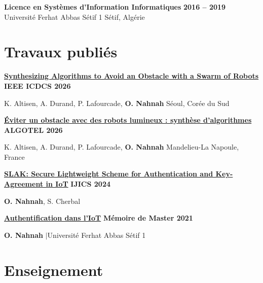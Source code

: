 \documentclass[a4paper,10pt]{article}
\begin{document}
\vspace{3pt}

\textbf{Licence en Systèmes d’Information Informatiques} \hfill \textbf{2016 -- 2019}\\
\textcolor{textgray}{Université Ferhat Abbas Sétif 1 \hfill Sétif, Algérie}

\section{Travaux publiés}

\noindent\href{https://sancy.iut.uca.fr/~durand/docs/ICDCS26.pdf}{\textbf{Synthesizing Algorithms to Avoid an Obstacle with a Swarm of Robots}} \hfill \textbf{IEEE ICDCS 2026}\par
\noindent\textcolor{textgray}{K. Altisen, A. Durand, P. Lafourcade, \textbf{O. Nahnah} \hfill Séoul, Corée du Sud}\par

\vspace{3pt}

\noindent\href{https://uca.hal.science/hal-05600384v1/file/algotel.pdf}{\textbf{Éviter un obstacle avec des robots lumineux : synthèse d’algorithmes}} \hfill \textbf{ALGOTEL 2026}\par
\noindent\textcolor{textgray}{K. Altisen, A. Durand, P. Lafourcade, \textbf{O. Nahnah} \hfill Mandelieu-La Napoule, France}\par

\vspace{3pt}

\noindent\href{https://doi.org/10.1504/IJICS.2024.137741}{\textbf{SLAK: Secure Lightweight Scheme for Authentication and Key-Agreement in IoT}} \hfill \textbf{IJICS 2024}\par
\noindent\textcolor{textgray}{\textbf{O. Nahnah}, S. Cherbal}\par

\vspace{3pt}

\noindent\href{https://overleaf.com/read/cmbwcyphtjbn#285e0a}{\textbf{Authentification dans l’IoT}} \hfill \textbf{Mémoire de Master 2021}\par
\noindent\textcolor{textgray}{\textbf{O. Nahnah} \enspace$|$\enspace Université Ferhat Abbas Sétif 1}\par

\section{Enseignement}
\end{document}
